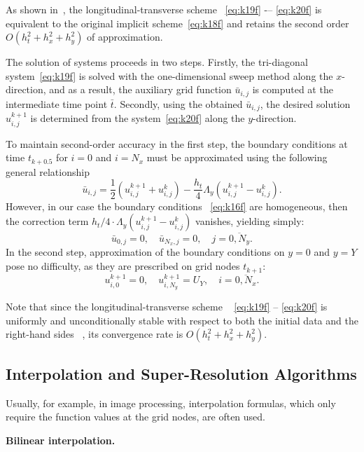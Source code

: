 \documentclass{ieeeaccess}
\begin{document}
As shown in~\cite{Samarskii}, the longitudinal-transverse  scheme ~\eqref{eq:k19f} -– \eqref{eq:k20f} is equivalent to the original implicit scheme~\eqref{eq:k18f} and retains the second order  $O(h_t^2 + h_x^2 + h_y^2)$ of approximation.

The solution of systems proceeds in two steps. Firstly, the tri-diagonal system~\eqref{eq:k19f} is solved  with the one-dimensional sweep method along the $x$-direction, and as a result, the auxiliary grid function $\bar{u}_{i,j}$ is computed at the intermediate time point $\bar{t}$. Secondly, using the obtained $\bar{u}_{i,j}$, the desired solution $u_{i,j}^{k+1}$ is determined from the system~\eqref{eq:k20f} along the $y$-direction.

To maintain second-order accuracy in the first step, the boundary conditions at time $t_{k+0.5}$ for  
$i = 0$  and $i = N_x$ must be approximated using the following general relationship
$$
\bar{u}_{i,j} = \frac{1}{2} \left( u_{i,j}^{k+1} + u_{i,j}^k \right) - \frac{h_t}{4} \Lambda_y \left( u_{i,j}^{k+1} - u_{i,j}^k \right).
$$
However, in our case  the boundary conditions ~\eqref{eq:k16f} are homogeneous, then the correction term ${h_t}/4 \cdot {\Lambda _y}\left( {u_{i,j}^{k + 1} - u_{i,j}^k} \right)$ vanishes, yielding simply:
%
$$
\bar{u}_{0,j} = 0, \quad \bar{u}_{N_x,j} = 0, \quad j = \overline{0,N_y}.
$$
In the second step, approximation of the boundary conditions on $y = 0$ and $y = Y$ pose no difficulty, as they are prescribed on grid nodes $t_{k+1}$:
%
$$
u_{i,0}^{k+1} = 0, \quad u_{i,N_y}^{k+1} = U_Y, \quad i = \overline{0,N_x}.
$$

Note that since the longitudinal-transverse scheme  
~ \eqref{eq:k19f} -- \eqref{eq:k20f} is uniformly and unconditionally stable with respect to both the initial data and the right-hand sides ~\cite{Samarskii}, its convergence rate is $O(h_t^ 2 + h_x^2 + h_y^2)$.

\subsection{Interpolation and Super-Resolution Algorithms}

Usually, for example, in image processing, interpolation formulas, which only require the function values at the grid nodes, are often used.

\textbf{Bilinear interpolation.}
\end{document}
